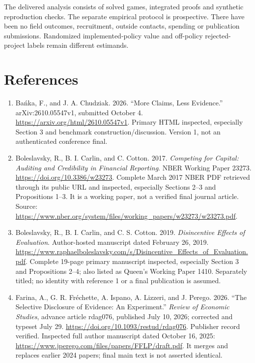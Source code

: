 \documentclass[11pt]{article}
\begin{document}
The delivered analysis consists of solved games, integrated proofs and synthetic reproduction checks. The separate empirical protocol is prospective. There have been no field outcomes, recruitment, outside contacts, spending or publication submissions. Randomized implemented-policy value and off-policy rejected-project labels remain different estimands.


{
\small
\setlength{\parindent}{0pt}
\section*{References}\label{sec:refs}
\small
\begin{enumerate}\setlength\itemsep{5pt}
\item Ba\'nka, F., and J. A. Chudziak. 2026. ``More Claims, Less Evidence.'' arXiv:2610.05547v1, submitted October 4. \url{https://arxiv.org/html/2610.05547v1}. Primary HTML inspected, especially Section 3 and benchmark construction/discussion. Version 1, not an authenticated conference final.
\item Boleslavsky, R., B. I. Carlin, and C. Cotton. 2017. \emph{Competing for Capital: Auditing and Credibility in Financial Reporting}. NBER Working Paper 23273. \url{https://doi.org/10.3386/w23273}. Complete March 2017 NBER PDF retrieved through its public URL and inspected, especially Sections 2--3 and Propositions 1--3. It is a working paper, not a verified final journal article. Source: \url{https://www.nber.org/system/files/working_papers/w23273/w23273.pdf}.
\item Boleslavsky, R., B. I. Carlin, and C. S. Cotton. 2019. \emph{Disincentive Effects of Evaluation}. Author-hosted manuscript dated February 26, 2019. \url{https://www.raphaelboleslavsky.com/s/Disincentive_Effects_of_Evaluation.pdf}. Complete 19-page primary manuscript inspected, especially Section 3 and Propositions 2--4; also listed as Queen's Working Paper 1410. Separately titled; no identity with reference 1 or a final publication is assumed.
\item Farina, A., G. R. Fr\'echette, A. Ispano, A. Lizzeri, and J. Perego. 2026. ``The Selective Disclosure of Evidence: An Experiment.'' \emph{Review of Economic Studies}, advance article rdag076, published July 10, 2026; corrected and typeset July 29. \url{https://doi.org/10.1093/restud/rdag076}. Publisher record verified. Inspected full author manuscript dated October 16, 2025: \url{https://www.jperego.com/files/papers/FFLP/draft.pdf}. It merges and replaces earlier 2024 papers; final main text is not asserted identical.

\end{enumerate}}
\end{document}
